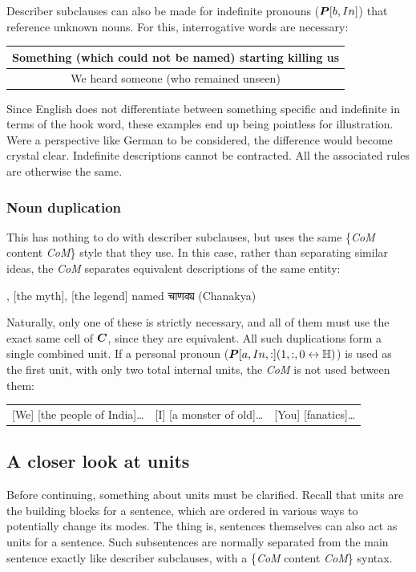 Describer subclauses can also be made for indefinite pronouns ($\boldsymbol{P}[b,In]$) that reference unknown nouns. For this, interrogative words are necessary:
\begin{example}
    \begin{tabular}{c}
        Something (which could not be named) starting killing us\\\hline We heard someone (who remained unseen)
    \end{tabular}
\end{example}
Since English does not differentiate between something specific and indefinite in terms of the hook word, these examples end up being pointless for illustration. Were a perspective like German to be considered, the difference would become crystal clear.  Indefinite descriptions cannot be contracted. All the associated rules are otherwise the same.
\subsubsection{Noun duplication}
This has nothing to do with describer subclauses, but uses the same \{\textit{CoM} content \textit{CoM}\} style that they use. In this case, rather than separating similar ideas, the \textit{CoM} separates equivalent descriptions of the same entity:
\begin{example}
    , [the myth], [the legend] named \textsanskrit{चाणक्य} (Chanakya)
\end{example}
Naturally, only one of these is strictly necessary, and all of them must use the exact same cell of $\boldsymbol{C}$, since they are equivalent. All such duplications form a single combined unit. If a personal pronoun ($\boldsymbol{P}[a,In,:](1,:,0\leftrightarrow\mathbb{H})$) is used as the first unit, with only two total internal units, the \textit{CoM} is not used between them:
\begin{example}
    \begin{tabular}{c|c|c}
    [We] [the people of India]\ldots & [I] [a monster of old]\ldots & [You] [fanatics]\ldots
    \end{tabular}
\end{example}
\subsection{A closer look at units}
Before continuing, something about units must be clarified. Recall that units are the building blocks for a sentence, which are ordered in various ways to potentially change its modes. The thing is, sentences themselves can also act as units for a sentence. Such subsentences are normally separated from the main sentence exactly like describer subclauses, with a \{\textit{CoM} content \textit{CoM}\} syntax. 

